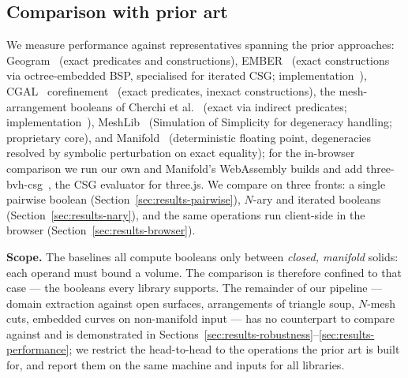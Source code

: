 \documentclass{egpubl}
\begin{document}
\subsection{Comparison with prior art}
\label{sec:results-scaling}

We measure performance against representatives spanning the prior approaches: Geogram~\cite{Geogram,Levy2025} (exact predicates and constructions), EMBER~\cite{Trettner2022} (exact constructions via octree-embedded BSP, specialised for iterated CSG; implementation~\cite{Solidean}), CGAL~\cite{CGAL2023} corefinement~\cite{CGALCorefinement} (exact predicates, inexact constructions), the mesh-arrangement booleans of Cherchi et al.~\cite{Cherchi2022} (exact via indirect predicates; implementation~\cite{CherchiImpl}), MeshLib~\cite{MeshLib} (Simulation of Simplicity for degeneracy handling; proprietary core), and Manifold~\cite{Manifold} (deterministic floating point, degeneracies resolved by symbolic perturbation on exact equality); for the in-browser comparison we run our own and Manifold's WebAssembly builds and add three-bvh-csg~\cite{ThreeBvhCsg}, the CSG evaluator for three.js. We compare on three fronts: a single pairwise boolean (Section~\ref{sec:results-pairwise}), $N$-ary and iterated booleans (Section~\ref{sec:results-nary}), and the same operations run client-side in the browser (Section~\ref{sec:results-browser}).

\textbf{Scope.} The baselines all compute booleans only between \emph{closed, manifold} solids: each operand must bound a volume. The comparison is therefore confined to that case --- the booleans every library supports. The remainder of our pipeline --- domain extraction against open surfaces, arrangements of triangle soup, $N$-mesh cuts, embedded curves on non-manifold input --- has no counterpart to compare against and is demonstrated in Sections~\ref{sec:results-robustness}--\ref{sec:results-performance}; we restrict the head-to-head to the operations the prior art is built for, and report them on the same machine and inputs for all libraries.
\end{document}

